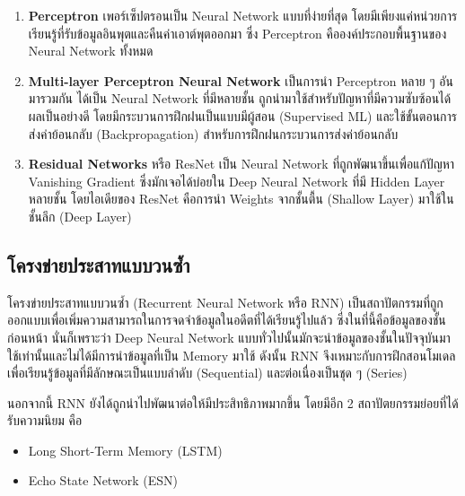 \begin{enumerate}[topsep=0pt,noitemsep]\setlength\itemsep{0.5em}
    \item \textbf{Perceptron} เพอร์เซ็ปตรอนเป็น Neural Network แบบที่ง่ายที่สุด โดยมีเพียงแค่หน่วยการเรียนรู้ที่รับข้อมูลอินพุตและคืนค่าเอาต์พุตออกมา ซึ่ง Perceptron คือองค์ประกอบพื้นฐานของ Neural Network ทั้งหมด

    \item \textbf{Multi-layer Perceptron Neural Network} เป็นการนำ Perceptron หลาย ๆ อันมารวมกัน ได้เป็น Neural Network ที่มีหลายชั้น ถูกนำมาใช้สำหรับปัญหาที่มีความซับซ้อนได้ผลเป็นอย่างดี โดยมีกระบวนการฝึกฝนเป็นแบบมีผู้สอน (Supervised ML) และใช้ขั้นตอนการส่งค่าย้อนกลับ (Backpropagation) สำหรับการฝึกฝนกระบวนการส่งค่าย้อนกลับ

    \item \textbf{Residual Networks} หรือ ResNet เป็น Neural Network ที่ถูกพัฒนาขึ้นเพื่อแก้ปัญหา Vanishing Gradient ซึ่งมักเจอได้บ่อยใน Deep Neural Network ที่มี Hidden Layer หลายชั้น โดยไอเดียของ ResNet คือการนำ Weights จากชั้นตื้น (Shallow Layer) มาใช้ในชั้นลึก (Deep Layer)
\end{enumerate}

\subsection{โครงข่ายประสาทแบบวนซ้ำ}
\label{ssec:rnn}

โครงข่ายประสาทแบบวนซ้ำ (Recurrent Neural Network หรือ RNN)\autocite{abiodun2018} เป็นสถาปัตกรรมที่ถูกออกแบบเพื่อเพิ่มความสามารถในการจดจำข้อมูลในอดีตที่ได้เรียนรู้ไปแล้ว ซึ่งในที่นี้คือข้อมูลของชั้นก่อนหน้า นั่นก็เพราะว่า Deep Neural Network แบบทั่วไปนั้นมักจะนำข้อมูลของชั้นในปัจจุบันมาใช้เท่านั้นและไม่ได้มีการนำข้อมูลที่เป็น Memory มาใช้ ดังนั้น RNN จึงเหมาะกับการฝึกสอนโมเดลเพื่อเรียนรู้ข้อมูลที่มีลักษณะเป็นแบบลำดับ (Sequential) และต่อเนื่องเป็นชุด ๆ (Series)

นอกจากนี้ RNN ยังได้ถูกนำไปพัฒนาต่อให้มีประสิทธิภาพมากขึ้น โดยมีอีก 2 สถาปัตยกรรมย่อยที่ได้รับความนิยม คือ
%
\begin{itemize}[topsep=0pt,noitemsep]\setlength\itemsep{0.5em}
    \item Long Short-Term Memory (LSTM)\autocite{hochreiter1997a}
    \item Echo State Network (ESN)\autocite{jaeger2004}
\end{itemize}

